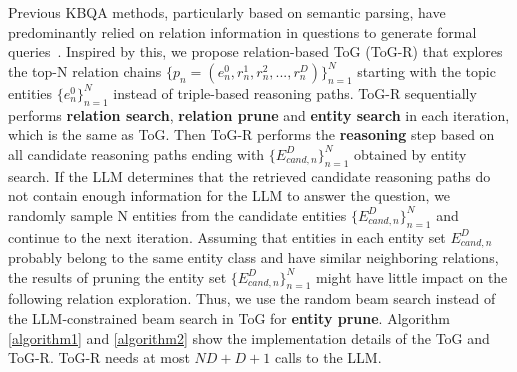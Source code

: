 Previous KBQA methods, particularly based on semantic parsing, have predominantly relied on relation information in questions to generate formal queries~\citep{complexKBQA}. Inspired by this, we propose relation-based ToG (ToG-R) that explores the top-N relation chains $\{p_n = (e^{0}_n,r^{1}_n,r^{2}_n,...,r^{D}_n)\}^N_{n=1}$ starting with the topic entities $\{e^{0}_n\}^N_{n=1}$ instead of triple-based reasoning paths. ToG-R sequentially performs \textbf{relation search}, \textbf{relation prune} and \textbf{entity search} in each iteration, which is the same as ToG. Then ToG-R performs the \textbf{reasoning} step based on all candidate reasoning paths ending with $\{E^{D}_{cand,n}\}^N_{n=1}$ obtained by entity search. If the LLM determines that the retrieved candidate reasoning paths do not contain enough information for the LLM to answer the question, we randomly sample N entities from the candidate entities $\{E^{D}_{cand,n}\}^N_{n=1}$ and continue to the next iteration. Assuming that entities in each entity set $E^{D}_{cand,n}$ probably belong to the same entity class and have similar neighboring relations, the results of pruning the entity set $\{E^{D}_{cand,n}\}^N_{n=1}$ might have little impact on the following relation exploration. Thus, we use the random beam search instead of the LLM-constrained beam search in ToG for \textbf{entity prune}. Algorithm \ref{algorithm1} and \ref{algorithm2} show the implementation details of the ToG and ToG-R. ToG-R needs at most $ND+D+1$ calls to the LLM.



